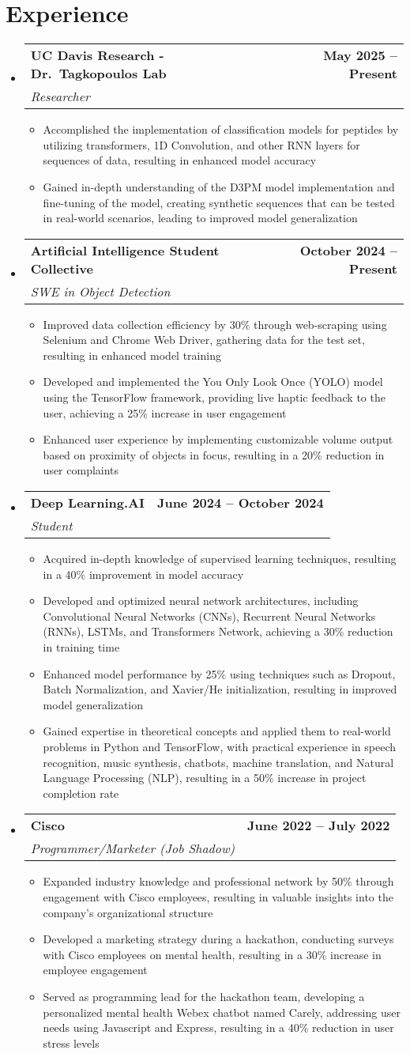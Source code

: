 \documentclass[letterpaper,11pt]{article}
\makeatletter
\newcommand{\resumeItem}[1]{\item\small{#1 \vspace{-2pt}}}
\newcommand{\resumeSubheading}[4]{
  \vspace{-2pt}\item
  \begin{tabular*}{1.0\textwidth}[t]{l@{\extracolsep{\fill}}r}
    \textbf{#1} & \textbf{\small #2} \\
    \textit{\small#3} & \textit{\small #4} \\
  \end{tabular*}\vspace{-7pt}
}
\newcommand{\resumeItemListStart}{\begin{itemize}}
\newcommand{\resumeItemListEnd}{\end{itemize}\vspace{-5pt}}
\newcommand{\resumeSubHeadingListStart}{\begin{itemize}[leftmargin=0.0in, label={}]}
\newcommand{\resumeSubHeadingListEnd}{\end{itemize}}
\makeatother
\begin{document}
\section{Experience}
\resumeSubHeadingListStart
  \resumeSubheading
    {UC Davis Research - Dr.\ Tagkopoulos Lab}{May 2025 -- Present}
    {Researcher}{}
    \resumeItemListStart
        \resumeItem{Accomplished the implementation of classification models for peptides by utilizing transformers, 1D Convolution, and other RNN layers for sequences of data, resulting in enhanced model accuracy}
        \resumeItem{Gained in-depth understanding of the D3PM model implementation and fine-tuning of the model, creating synthetic sequences that can be tested in real-world scenarios, leading to improved model generalization}
    \resumeItemListEnd
  \resumeSubheading
    {Artificial Intelligence Student Collective}{October 2024 -- Present}
    {SWE in Object Detection}{}
    \resumeItemListStart
        \resumeItem{Improved data collection efficiency by 30\% through web-scraping using Selenium and Chrome Web Driver, gathering data for the test set, resulting in enhanced model training}
        \resumeItem{Developed and implemented the You Only Look Once (YOLO) model using the TensorFlow framework, providing live haptic feedback to the user, achieving a 25\% increase in user engagement}
        \resumeItem{Enhanced user experience by implementing customizable volume output based on proximity of objects in focus, resulting in a 20\% reduction in user complaints}
    \resumeItemListEnd
  \resumeSubheading
    {Deep Learning.AI}{June 2024 -- October 2024}
    {Student}{}
    \resumeItemListStart
        \resumeItem{Acquired in-depth knowledge of supervised learning techniques, resulting in a 40\% improvement in model accuracy}
        \resumeItem{Developed and optimized neural network architectures, including Convolutional Neural Networks (CNNs), Recurrent Neural Networks (RNNs), LSTMs, and Transformers Network, achieving a 30\% reduction in training time}
        \resumeItem{Enhanced model performance by 25\% using techniques such as Dropout, Batch Normalization, and Xavier/He initialization, resulting in improved model generalization}
        \resumeItem{Gained expertise in theoretical concepts and applied them to real-world problems in Python and TensorFlow, with practical experience in speech recognition, music synthesis, chatbots, machine translation, and Natural Language Processing (NLP), resulting in a 50\% increase in project completion rate}
    \resumeItemListEnd
  \resumeSubheading
    {Cisco}{June 2022 -- July 2022}
    {Programmer/Marketer (Job Shadow)}{}
    \resumeItemListStart
        \resumeItem{Expanded industry knowledge and professional network by 50\% through engagement with Cisco employees, resulting in valuable insights into the company's organizational structure}
        \resumeItem{Developed a marketing strategy during a hackathon, conducting surveys with Cisco employees on mental health, resulting in a 30\% increase in employee engagement}
        \resumeItem{Served as programming lead for the hackathon team, developing a personalized mental health Webex chatbot named Carely, addressing user needs using Javascript and Express, resulting in a 40\% reduction in user stress levels}
    \resumeItemListEnd
\resumeSubHeadingListEnd
\end{document}
